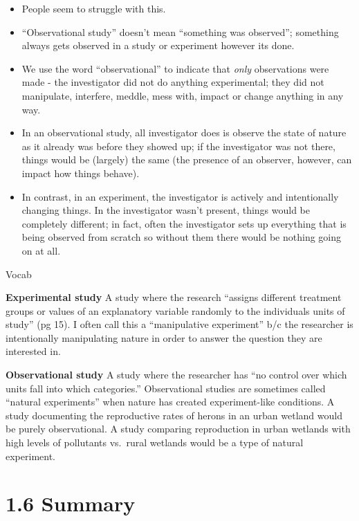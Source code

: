 \documentclass[]{book}
\providecommand{\tightlist}{%
  \setlength{\itemsep}{0pt}\setlength{\parskip}{0pt}}
\theoremstyle{definition}
\theoremstyle{definition}
\theoremstyle{definition}
\theoremstyle{remark}
\begin{document}
\begin{itemize}
\tightlist
\item
  People seem to struggle with this.
\item
  ``Observational study'' doesn't mean ``something was observed'';
  something always gets observed in a study or experiment however its
  done.\\
\item
  We use the word ``observational'' to indicate that \emph{only}
  observations were made - the investigator did not do anything
  experimental; they did not manipulate, interfere, meddle, mess with,
  impact or change anything in any way.\\
\item
  In an observational study, all investigator does is observe the state
  of nature as it already was before they showed up; if the investigator
  was not there, things would be (largely) the same (the presence of an
  observer, however, can impact how things behave).
\item
  In contrast, in an experiment, the investigator is actively and
  intentionally changing things. In the investigator wasn't present,
  things would be completely different; in fact, often the investigator
  sets up everything that is being observed from scratch so without them
  there would be nothing going on at all.
\end{itemize}

Vocab

\textbf{Experimental study} A study where the research ``assigns
different treatment groups or values of an explanatory variable randomly
to the individuals units of study'' (pg 15). I often call this a
``manipulative experiment'' b/c the researcher is intentionally
manipulating nature in order to answer the question they are interested
in.

\textbf{Observational study} A study where the researcher has ``no
control over which units fall into which categories.'' Observational
studies are sometimes called ``natural experiments'' when nature has
created experiment-like conditions. A study documenting the reproductive
rates of herons in an urban wetland would be purely observational. A
study comparing reproduction in urban wetlands with high levels of
pollutants vs.~rural wetlands would be a type of natural experiment.

\section{1.6 Summary}\label{summary}
\end{document}
